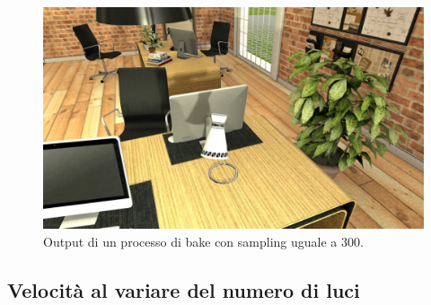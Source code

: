 \\
\begin{figure}[htb]
 \centering
 \includegraphics[width=0.7\linewidth]{images/chapter_prove_sperimentali/sampl300.png}\hfill
 \caption[Output sampling 300]{Output di un processo di bake con sampling uguale a 300.}
 \label{fig:sampl300}
\end{figure}

\subsection{Velocità al variare del numero di luci}
\label{sec:chapter_prove_sperimentali_servizio_baking_vel_luci}

